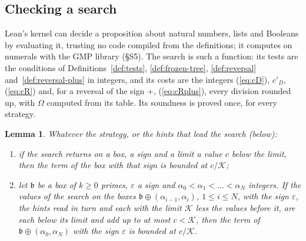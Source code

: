 \documentclass[11pt]{article}
\newtheorem{lemma}[theorem]{Lemma}
\theoremstyle{definition}
\begin{document}
\subsection{Checking a search}\label{sec:checking}

Lean's kernel can decide a proposition about natural numbers, lists and Booleans by evaluating it, trusting no code
compiled from the definitions; it computes on numerals with the GMP library (\S S5). The search is such a function: its
tests are the conditions of Definitions~\ref{def:tests},
\ref{def:frozen-tree}, \ref{def:reversal} and~\ref{def:reversal-plus} in integers, and its costs are the integers
(\ref{eq:cD}), $c'_D$, (\ref{eq:cR}) and, for a reversal of the sign $+$, (\ref{eq:cRplus}), every division rounded
up, with $\Omega$ computed from its table. Its soundness is proved once, for every strategy.

\begin{lemma}\label{lem:search}
Whatever the strategy, or the hints that lead the search (below):
\begin{enumerate}
\item[(a)] if the search returns on a box, a sign and a limit a value $c$ below the limit, then the term of the box
  with that sign is bounded at $c/\mathcal K$;
\item[(b)] let $\mathfrak b$ be a box of $k \ge 0$ primes, $\varepsilon$ a sign and $\alpha_0 < \alpha_1 < \dots <
  \alpha_N$ integers. If the values of the search on the boxes $\mathfrak b \oplus (\alpha_{i - 1}, \alpha_i)$,
  $1 \le i \le N$, with the sign $\varepsilon$, the hints read in turn and each with the limit $\mathcal K$ less
  the values before it, are each below its limit and add up to at most $c < \mathcal K$, then the term of $\mathfrak b
  \oplus (\alpha_0, \alpha_N)$ with the sign $\varepsilon$ is bounded at $c/\mathcal K$.
\end{enumerate}
\end{lemma}
\end{document}
